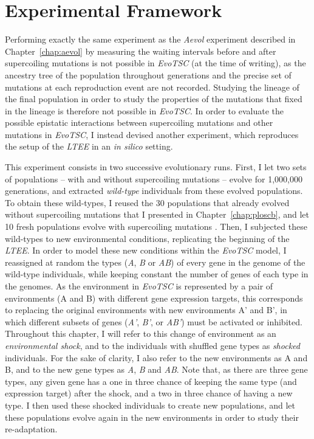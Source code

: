 \section{Experimental Framework}

Performing exactly the same experiment as the \emph{Aevol} experiment described in Chapter~\ref{chap:aevol} by measuring the waiting intervals before and after supercoiling mutations is not possible in \emph{EvoTSC} (at the time of writing), as the ancestry tree of the population throughout generations and the precise set of mutations at each reproduction event are not recorded.
Studying the lineage of the final population in order to study the properties of the mutations that fixed in the lineage is therefore not possible in \emph{EvoTSC}.
In order to evaluate the possible epistatic interactions between supercoiling mutations and other mutations in \emph{EvoTSC}, I instead devised another experiment, which reproduces the setup of the \emph{LTEE} in an \emph{in silico} setting.

This experiment consists in two successive evolutionary runs.
First, I let two sets of populations -- with and without supercoiling mutations -- evolve for 1,000,000 generations, and extracted \emph{wild-type} individuals from these evolved populations.
To obtain these wild-types, I reused the 30 populations that already evolved without supercoiling mutations that I presented in Chapter~\ref{chap:ploscb}, and let 10 fresh populations evolve with supercoiling mutations .
Then, I subjected these wild-types to new environmental conditions, replicating the beginning of the \emph{LTEE}.
In order to model these new conditions within the \emph{EvoTSC} model, I reassigned at random the types (\emph{A}, \emph{B} or \emph{AB}) of every gene in the genome of the wild-type individuals, while keeping constant the number of genes of each type in the genomes.
As the environment in \emph{EvoTSC} is represented by a pair of environments (A and B) with different gene expression targets, this corresponds to replacing the original environments with new environments A' and B', in which different subsets of genes (\emph{A'}, \emph{B'}, or \emph{AB'}) must be activated or inhibited.
Throughout this chapter, I will refer to this change of environment as an \emph{environmental shock}, and to the individuals with shuffled gene types as \emph{shocked} individuals.
For the sake of clarity, I also refer to the new environments as A and B, and to the new gene types as \emph{A}, \emph{B} and \emph{AB}.
Note that, as there are three gene types, any given gene has a one in three chance of keeping the same type (and expression target) after the shock, and a two in three chance of having a new type.
I then used these shocked individuals to create new populations, and let these populations evolve again in the new environments in order to study their re-adaptation.

